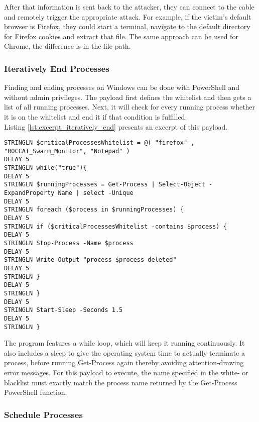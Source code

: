 After that information is sent back to the attacker, they can connect to the cable and remotely trigger the appropriate attack. For example, if the victim's default browser is Firefox, they could start a terminal, navigate to the default directory for Firefox cookies and extract that file. The same approach can be used for Chrome, the difference is in the file path.


\subsubsection{Iteratively End Processes}

Finding and ending processes on Windows can be done with PowerShell and without admin privileges. The payload first defines the whitelist and then gets a list of all running processes. Next, it will check for every running process whether it is on the whitelist and end it if that condition is fulfilled. \\
Listing \ref{lst:excerpt_iteratively_end} presents an excerpt of this payload.

\begin{lstlisting}[caption={Exceprt: a PowerShell looop that ends a running process if it is contained in the whitelist}, label={lst:excerpt_iteratively_end}, captionpos=b]
STRINGLN $criticalProcessesWhitelist = @( "firefox" , "ROCCAT_Swarm_Monitor", "Notepad" )
DELAY 5
STRINGLN while("true"){
DELAY 5
STRINGLN $runningProcesses = Get-Process | Select-Object -ExpandProperty Name | select -Unique
DELAY 5
STRINGLN foreach ($process in $runningProcesses) {
DELAY 5
STRINGLN if ($criticalProcessesWhitelist -contains $process) {
DELAY 5
STRINGLN Stop-Process -Name $process
DELAY 5
STRINGLN Write-Output "process $process deleted"
DELAY 5
STRINGLN }
DELAY 5
STRINGLN }
DELAY 5
STRINGLN Start-Sleep -Seconds 1.5
DELAY 5
STRINGLN }
\end{lstlisting}

The program features a while loop, which will keep it running continuously. It also includes a sleep to give the operating system time to actually terminate a process, before running Get-Process again thereby avoiding attention-drawing error messages. For this payload to execute, the name specified in the white- or blacklist must exactly match the process name returned by the Get-Process PowerShell function.



\subsubsection{Schedule Processes}

